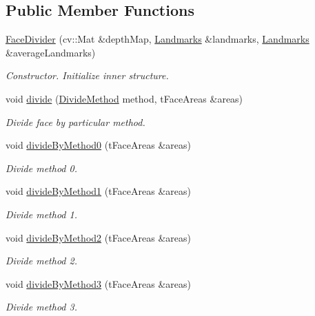 \subsection*{Public Member Functions}
\begin{DoxyCompactItemize}
\item 
\hyperlink{class_face_divider_a5974458a52194b1f536a8ec8e54e2434}{Face\+Divider} (cv\+::\+Mat \&depth\+Map, \hyperlink{class_landmarks}{Landmarks} \&landmarks, \hyperlink{class_landmarks}{Landmarks} \&average\+Landmarks)
\begin{DoxyCompactList}\small\item\em Constructor. Initialize inner structure. \end{DoxyCompactList}\item 
void \hyperlink{class_face_divider_afebf9eb1c55130c266c85209b2a4ed33}{divide} (\hyperlink{class_face_divider_afd66ad7d2423aaa67e20a7f6cbabb6ef}{Divide\+Method} method, t\+Face\+Areas \&areas)
\begin{DoxyCompactList}\small\item\em Divide face by particular method. \end{DoxyCompactList}\item 
void \hyperlink{class_face_divider_a64ffeae0a8d249ac62d059d788b65b11}{divide\+By\+Method0} (t\+Face\+Areas \&areas)
\begin{DoxyCompactList}\small\item\em Divide method 0. \end{DoxyCompactList}\item 
void \hyperlink{class_face_divider_a7f586db305c2a80f2032c32c67ab02cf}{divide\+By\+Method1} (t\+Face\+Areas \&areas)
\begin{DoxyCompactList}\small\item\em Divide method 1. \end{DoxyCompactList}\item 
void \hyperlink{class_face_divider_ac60c70ab0193b411214863539c9bfccd}{divide\+By\+Method2} (t\+Face\+Areas \&areas)
\begin{DoxyCompactList}\small\item\em Divide method 2. \end{DoxyCompactList}\item 
void \hyperlink{class_face_divider_a2c3ce79f023170aadfaffd07cdef970b}{divide\+By\+Method3} (t\+Face\+Areas \&areas)
\begin{DoxyCompactList}\small\item\em Divide method 3. \end{DoxyCompactList}\item 

\end{DoxyCompactItemize}
